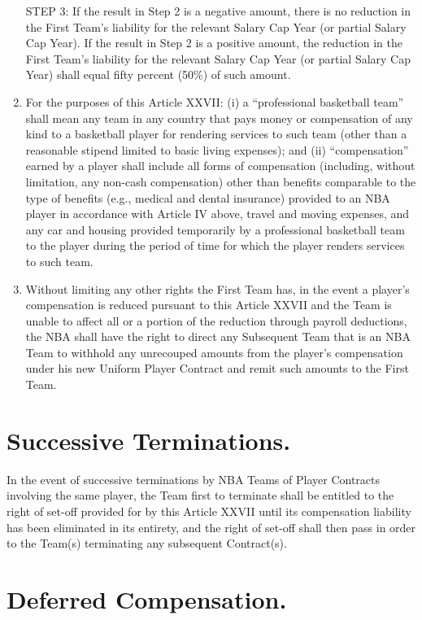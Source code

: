 \documentclass[
]{book}
\begin{document}
\begin{enumerate}
  STEP 3: If the result in Step 2 is a negative amount, there is no reduction in the First Team's liability for the relevant Salary Cap Year (or partial Salary Cap Year). If the result in Step 2 is a positive amount, the reduction in the First Team's liability for the relevant Salary Cap Year (or partial Salary Cap Year) shall equal fifty percent (50\%) of such amount.
\item
  For the purposes of this Article XXVII: (i) a ``professional basketball team'' shall mean any team in any country that pays money or compensation of any kind to a basketball player for rendering services to such team (other than a reasonable stipend limited to basic living expenses); and (ii) ``compensation'' earned by a player shall include all forms of compensation (including, without limitation, any non-cash compensation) other than benefits comparable to the type of benefits (e.g., medical and dental insurance) provided to an NBA player in accordance with Article IV above, travel and moving expenses, and any car and housing provided temporarily by a professional basketball team to the player during the period of time for which the player renders services to such team.
\item
  Without limiting any other rights the First Team has, in the event a player's compensation is reduced pursuant to this Article XXVII and the Team is unable to affect all or a portion of the reduction through payroll deductions, the NBA shall have the right to direct any Subsequent Team that is an NBA Team to withhold any unrecouped amounts from the player's compensation under his new Uniform Player Contract and remit such amounts to the First Team.
\end{enumerate}

\hypertarget{successive-terminations.}{%
\section{Successive Terminations.}\label{successive-terminations.}}

In the event of successive terminations by NBA Teams of Player Contracts involving the same player, the Team first to terminate shall be entitled to the right of set-off provided for by this Article XXVII until its compensation liability has been eliminated in its entirety, and the right of set-off shall then pass in order to the Team(s) terminating any subsequent Contract(s).

\hypertarget{deferred-compensation.}{%
\section{Deferred Compensation.}\label{deferred-compensation.}}
\end{document}
